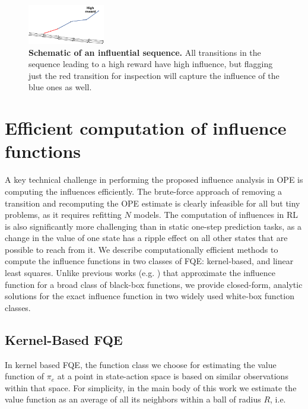 \documentclass{article}
\begin{document}
\begin{figure}[t]
\centering
\includegraphics[width=0.3\textwidth]{influential_sequence.pdf}
\caption{\textbf{Schematic of an influential sequence.} All transitions in the sequence leading to a high reward have high influence, but flagging just the red transition for inspection will capture the influence of the blue ones as well.}\label{fig:influential_sequence}
\end{figure}

\section{Efficient computation of influence functions}
\label{sec:computation_of_influence}

A key technical challenge in performing the proposed influence analysis in OPE is computing the influences efficiently. The brute-force approach of removing a transition and recomputing the OPE estimate is clearly infeasible for all but tiny problems, as it requires refitting $N$ models. The computation of influences in RL is also significantly more challenging than in static one-step prediction tasks, as a change in the value of one state has a ripple effect on all other states that are possible to reach from it. We describe computationally efficient methods to compute the influence functions in two classes of FQE: kernel-based, and linear least squares. Unlike previous works (e.g. \citep{koh2017understanding}) that approximate the influence function for a broad class of black-box functions, we provide closed-form, analytic solutions for the exact influence function in two widely used white-box function classes.

\subsection{Kernel-Based FQE}
\label{sec:kernel_based_fqe}

In kernel based FQE, the function class we choose for estimating the value function of $\pi_e$ at a point in state-action space is based on similar observations within that space. For simplicity, in the main body of this work we estimate the value function as an average of all its neighbors within a ball of radius $R$, i.e.
\end{document}
